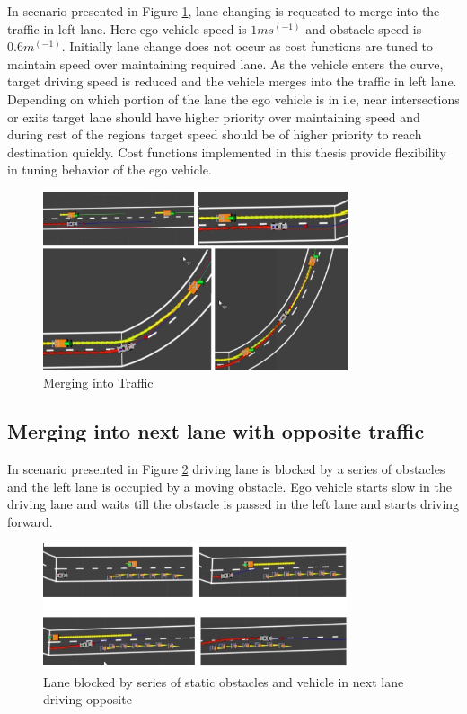 In scenario presented in Figure \ref{merging1}, lane changing is requested to merge into the traffic in left lane. Here ego vehicle speed is $1ms^(-1)$ and obstacle speed is $0.6m^(-1)$. Initially lane change does not occur as cost functions are tuned to maintain speed over maintaining required lane. As the vehicle enters the curve, target driving speed is reduced and the vehicle merges into the traffic in left lane. Depending on which portion of the lane the ego vehicle is in i.e, near intersections or exits target lane should have higher priority over maintaining speed and during rest of the regions target speed should be of higher priority to reach destination quickly. Cost functions implemented in this thesis provide flexibility in tuning behavior of the ego vehicle. 

\begin{figure}[h]
    \centering
    \includegraphics[width=0.8\textwidth]{Images/evaluation/merging1.jpg}
    \caption{Merging into Traffic}
    \label{merging1}
\end{figure}

\subsection{Merging into next lane with opposite traffic}

In scenario presented in Figure \ref{series_obstacles} driving lane is blocked by a series of obstacles and the left lane is occupied by a moving obstacle. Ego vehicle starts slow in the driving lane and waits till the obstacle is passed in the left lane and starts driving forward. 
\begin{figure}[h]
    \centering
    \includegraphics[width=0.8\textwidth]{Images/evaluation/series_lane_blocked1.jpg}
    \caption{Lane blocked by series of static obstacles and vehicle in next lane driving opposite}
    \label{series_obstacles}
\end{figure}

